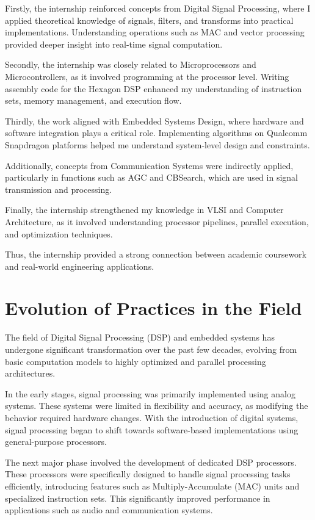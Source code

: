 \documentclass[12pt,a4paper]{report}
\begin{document}
Firstly, the internship reinforced concepts from Digital Signal Processing, where I applied theoretical knowledge of signals, filters, and transforms into practical implementations. Understanding operations such as MAC and vector processing provided deeper insight into real-time signal computation.


Secondly, the internship was closely related to Microprocessors and Microcontrollers, as it involved programming at the processor level. Writing assembly code for the Hexagon DSP enhanced my understanding of instruction sets, memory management, and execution flow.


Thirdly, the work aligned with Embedded Systems Design, where hardware and software integration plays a critical role. Implementing algorithms on Qualcomm Snapdragon platforms helped me understand system-level design and constraints.


Additionally, concepts from Communication Systems were indirectly applied, particularly in functions such as AGC and CBSearch, which are used in signal transmission and processing.


Finally, the internship strengthened my knowledge in VLSI and Computer Architecture, as it involved understanding processor pipelines, parallel execution, and optimization techniques.


Thus, the internship provided a strong connection between academic coursework and real-world engineering applications.


\section{Evolution of Practices in the Field}

The field of Digital Signal Processing (DSP) and embedded systems has undergone significant transformation over the past few decades, evolving from basic computation models to highly optimized and parallel processing architectures.


In the early stages, signal processing was primarily implemented using analog systems. These systems were limited in flexibility and accuracy, as modifying the behavior required hardware changes. With the introduction of digital systems, signal processing began to shift towards software-based implementations using general-purpose processors.


The next major phase involved the development of dedicated DSP processors. These processors were specifically designed to handle signal processing tasks efficiently, introducing features such as Multiply-Accumulate (MAC) units and specialized instruction sets. This significantly improved performance in applications such as audio and communication systems.
\end{document}
